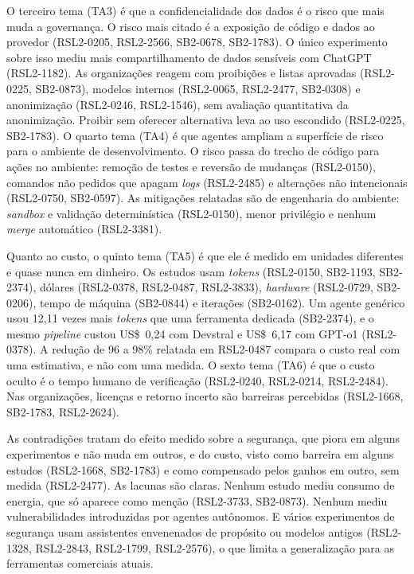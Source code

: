 O terceiro tema (TA3) é que a confidencialidade dos dados é o risco que mais
muda a governança. O risco mais citado é a exposição de código e dados ao
provedor (RSL2-0205, RSL2-2566, SB2-0678, SB2-1783). O único experimento
sobre isso mediu mais compartilhamento de dados sensíveis com ChatGPT
(RSL2-1182). As organizações reagem com proibições e listas aprovadas
(RSL2-0225, SB2-0873), modelos internos (RSL2-0065, RSL2-2477, SB2-0308) e
anonimização (RSL2-0246, RSL2-1546), sem avaliação quantitativa da
anonimização. Proibir sem oferecer alternativa leva ao uso escondido
(RSL2-0225, SB2-1783). O quarto tema (TA4) é que agentes ampliam a superfície
de risco para o ambiente de desenvolvimento. O risco passa do trecho de
código para ações no ambiente: remoção de testes e reversão de mudanças
(RSL2-0150), comandos não pedidos que apagam \textit{logs} (RSL2-2485) e
alterações não intencionais (RSL2-0750, SB2-0597). As mitigações relatadas
são de engenharia do ambiente: \textit{sandbox} e validação determinística
(RSL2-0150), menor privilégio e nenhum \textit{merge} automático (RSL2-3381).

Quanto ao custo, o quinto tema (TA5) é que ele é medido em unidades
diferentes e quase nunca em dinheiro. Os estudos usam \textit{tokens}
(RSL2-0150, SB2-1193, SB2-2374), dólares (RSL2-0378, RSL2-0487, RSL2-3833),
\textit{hardware} (RSL2-0729, SB2-0206), tempo de máquina (SB2-0844) e
iterações (SB2-0162). Um agente genérico usou 12,11 vezes mais
\textit{tokens} que uma ferramenta dedicada (SB2-2374), e o mesmo
\textit{pipeline} custou US\$~0,24 com Devstral e US\$~6,17 com GPT-o1
(RSL2-0378). A redução de 96 a 98\% relatada em RSL2-0487 compara o custo
real com uma estimativa, e não com uma medida. O sexto tema (TA6) é que o
custo oculto é o tempo humano de verificação (RSL2-0240, RSL2-0214,
RSL2-2484). Nas organizações, licenças e retorno incerto são barreiras
percebidas (RSL2-1668, SB2-1783, RSL2-2624).

As contradições tratam do efeito medido sobre a segurança, que piora em
alguns experimentos e não muda em outros, e do custo, visto como barreira em
alguns estudos (RSL2-1668, SB2-1783) e como compensado pelos ganhos em outro,
sem medida (RSL2-2477). As lacunas são claras. Nenhum estudo mediu consumo de
energia, que só aparece como menção (RSL2-3733, SB2-0873). Nenhum mediu
vulnerabilidades introduzidas por agentes autônomos. E vários experimentos de segurança usam assistentes envenenados de propósito ou
modelos antigos (RSL2-1328, RSL2-2843, RSL2-1799, RSL2-2576), o que limita a
generalização para as ferramentas comerciais atuais.

